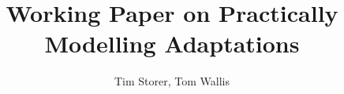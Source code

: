 \usepackage{hyperref}

\title{Working Paper on Practically Modelling Adaptations}

\author{Tim Storer, Tom Wallis}
